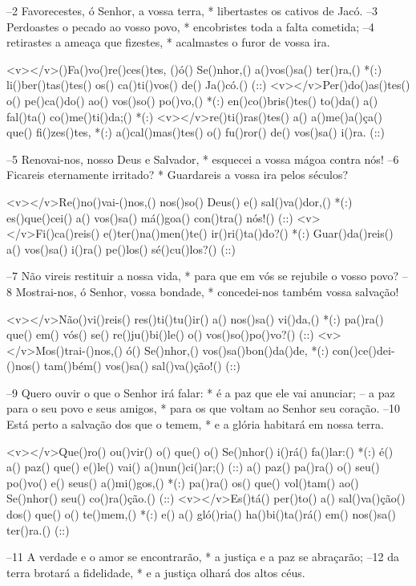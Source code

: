 –2 Favorecestes, ó Senhor, a vossa terra, * 
libertastes os cativos de Jacó. 
–3 Perdoastes o pecado ao vosso povo, * 
encobristes toda a falta cometida;
–4 retirastes a ameaça que fizestes, *
acalmastes o furor de vossa ira.

<v></v>()Fa()vo()re()ces()tes, ()ó() Se()nhor,() a()vos()sa() ter()ra,() *(:)
li()ber()tas()tes() os() ca()ti()vos() de() Ja()có.() (::)
<v></v>Per()do()as()tes() o() pe()ca()do() ao() vos()so() po()vo,() *(:)
en()co()bris()tes() to()da() a() fal()ta() co()me()ti()da;() *(:)
<v></v>re()ti()ras()tes() a() a()me()a()ça() que() fi()zes()tes, *(:)
a()cal()mas()tes() o() fu()ror() de() vos()sa() i()ra. (::)

–5 Renovai-nos, nosso Deus e Salvador, * 
esquecei a vossa mágoa contra nós!
–6 Ficareis eternamente irritado? * 
Guardareis a vossa ira pelos séculos? 

<v></v>Re()no()vai-()nos,() nos()so() Deus() e() sal()va()dor,() *(:)
es()que()cei() a() vos()sa() má()goa() con()tra() nós!() (::)
<v></v>Fi()ca()reis() e()ter()na()men()te() ir()ri()ta()do?() *(:)
Guar()da()reis() a() vos()sa() i()ra() pe()los() sé()cu()los?() (::)

–7 Não vireis restituir a nossa vida, * 
para que em vós se rejubile o vosso povo? 
–8 Mostrai-nos, ó Senhor, vossa bondade, * 
concedei-nos também vossa salvação! 

<v></v>Não()vi()reis() res()ti()tu()ir() a() nos()sa() vi()da,() *(:)
pa()ra() que() em() vós() se() re()ju()bi()le() o() vos()so()po()vo?() (::)
<v></v>Mos()trai-()nos,() ó() Se()nhor,() vos()sa()bon()da()de, *(:)
con()ce()dei-()nos() tam()bém() vos()sa() sal()va()ção!() (::)

–9 Quero ouvir o que o Senhor irá falar: * 
é a paz que ele vai anunciar; 
– a paz para o seu povo e seus amigos, * 
para os que voltam ao Senhor seu coração. 
–10 Está perto a salvação dos que o temem, * 
e a glória habitará em nossa terra. 

<v></v>Que()ro() ou()vir() o() que() o() Se()nhor() i()rá() fa()lar:() *(:)
é() a() paz() que() e()le() vai() a()nun()ci()ar;() (::)
a() paz() pa()ra() o() seu() po()vo() e() seus() a()mi()gos,() *(:)
pa()ra() os() que() vol()tam() ao() Se()nhor() seu() co()ra()ção.() (::)
<v></v>Es()tá() per()to() a() sal()va()ção() dos() que() o() te()mem,() *(:)
e() a() gló()ria() ha()bi()ta()rá() em() nos()sa() ter()ra.() (::)

–11 A verdade e o amor se encontrarão, * 
a justiça e a paz se abraçarão; 
–12 da terra brotará a fidelidade, * 
e a justiça olhará dos altos céus. 

